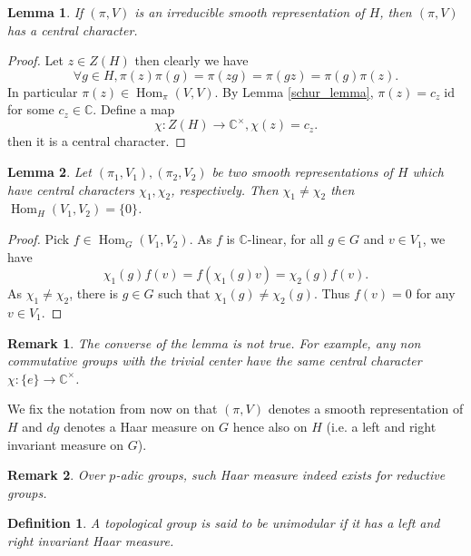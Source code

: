 \documentclass[8pt]{article}
\newtheorem{definition}{Definition}[section]
\newtheorem{lemma}{Lemma}[section]
\newtheorem{remark}{Remark}[section]
\DeclareMathOperator{\Hom}{Hom}
\DeclareMathOperator{\id}{id}
\newcommand{\C}[0]{\mathbb{C}}
\begin{document}
\begin{lemma}
  \label{lemma_3}
If $(\pi,V)$ is an irreducible smooth representation of $H$, then $(\pi,V)$ has a central character.
\end{lemma}

\begin{proof}
Let $z\in Z(H)$ then clearly we have
\begin{equation*}
\forall g\in H, \pi(z)\pi(g) =\pi(zg) = \pi(gz) = \pi(g)\pi(z).
\end{equation*}
In particular $\pi(z)\in\Hom_\pi(V,V)$. By Lemma \ref{schur_lemma}, $\pi(z) = c_z\id$ for some $c_z\in\C$. Define a map 
\begin{equation*}
\chi:Z(H)\to \C^\times,\chi(z)=c_z.
\end{equation*}
then it is a central character.
\end{proof}
\begin{lemma}
Let $(\pi_1,V_1),(\pi_2,V_2)$ be two smooth representations of $H$ which have central characters $\chi_1,\chi_2$, respectively. Then $\chi_1\not=\chi_2$ then $\Hom_H(V_1,V_2)=\{0\}$. 
\end{lemma}

\begin{proof}
Pick $f\in\Hom_G(V_1,V_2)$. As $f$ is $\C$-linear, for all $g\in G$ and $v\in V_1$, we have
\begin{equation*}
  \chi_1(g)f(v) = f(\chi_1(g)v) = \chi_2(g)f(v).
\end{equation*}
As $\chi_1\not=\chi_2$, there is $g\in G$ such that $\chi_1(g)\not=\chi_2(g)$. Thus $f(v) = 0$ for any $v\in V_1$.
\end{proof}

\begin{remark}
The converse of the lemma is not true. For example, any non commutative groups with the trivial center have the same central character $\chi:\{e\}\to\C^\times$. 
\end{remark}

We fix the notation from now on that $(\pi,V)$ denotes a smooth representation of $H$ and $dg$ denotes a Haar measure on $G$ hence also on $H$ (i.e. a left and right invariant measure on $G$).

\begin{remark}
  Over $p$-adic groups, such Haar measure indeed exists for reductive groups.
\end{remark}

\begin{definition}
A topological group is said to be unimodular if it has a left and right invariant Haar measure.
\end{definition}
\end{document}
